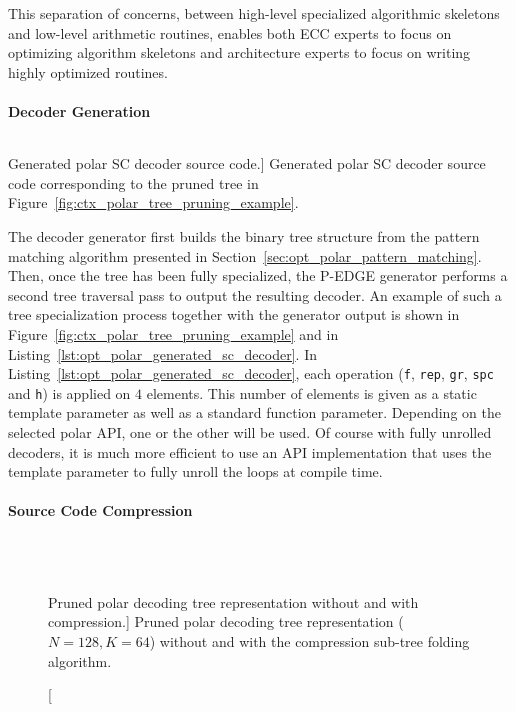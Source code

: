 This separation of concerns, between high-level specialized algorithmic
skeletons and low-level arithmetic routines, enables both ECC experts to focus
on optimizing algorithm skeletons and architecture experts to focus on writing
highly optimized routines.

\newpage
\paragraph{Decoder Generation}

\begin{listing}[htp]
  \inputminted[frame=lines,linenos]{C++}{\curChapter/src/polar/generated_sc_decoder.cpp}
  \caption
    [Generated polar SC decoder source code.]
    {Generated polar SC decoder source code corresponding to the pruned tree in
     Figure~\ref{fig:ctx_polar_tree_pruning_example}.}
  \label{lst:opt_polar_generated_sc_decoder}
\end{listing}

The decoder generator first builds the binary tree structure from the pattern
matching algorithm presented in Section~\ref{sec:opt_polar_pattern_matching}.
Then, once the tree has been fully specialized, the P-EDGE generator performs a
second tree traversal pass to output the resulting decoder. An example of such a
tree specialization process together with the generator output is shown in
Figure~\ref{fig:ctx_polar_tree_pruning_example} and in
Listing~\ref{lst:opt_polar_generated_sc_decoder}. In
Listing~\ref{lst:opt_polar_generated_sc_decoder}, each operation (\verb|f|,
\verb|rep|, \verb|gr|, \verb|spc| and \verb|h|) is applied on $4$ elements. This
number of elements is given as a static template parameter as well as a standard
function parameter. Depending on the selected polar API, one or the other will
be used. Of course with fully unrolled decoders, it is much more efficient to
use an API implementation that uses the template parameter to fully unroll the
loops at compile time.

\paragraph{Source Code Compression}
\label{sec:opt_polar_sc_compression}

\begin{figure}[htp]
  \centering
  \\
  \\
  \caption
    [Pruned polar decoding tree representation without and with compression.]
    {Pruned polar decoding tree representation ($N = 128, K = 64$) without
    and with the compression sub-tree folding algorithm.}
  \label{fig:opt_polar_sc_gen_compression}
\end{figure}

